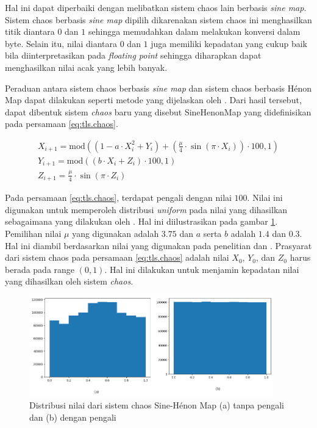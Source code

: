 Hal ini dapat diperbaiki dengan melibatkan sistem chaos lain berbasis \emph{sine map}. Sistem chaos berbasis \emph{sine map} dipilih dikarenakan sistem chaos ini menghasilkan titik diantara $0$ dan $1$ sehingga memudahkan dalam melakukan konversi dalam byte. Selain itu, nilai diantara $0$ dan $1$ juga memiliki kepadatan yang cukup baik bila diinterpretasikan pada \emph{floating point} sehingga diharapkan dapat menghasilkan nilai acak yang lebih banyak.

Peraduan antara sistem chaos berbasis \emph{sine map} dan sistem chaos berbasis Hénon Map dapat dilakukan seperti metode yang dijelaskan oleh \textcite{patel2021}. Dari hasil tersebut, dapat dibentuk sistem \emph{chaos} baru yang disebut SineHenonMap yang didefinisikan pada persamaan \ref{eq:tls.chaos}.

\begin{equation}
  \begin{aligned}
    X_{i+1} = \text{mod}((1 - a \cdot X_i^2 + Y_i) + (\frac{\mu}{4} \cdot \sin{(\pi \cdot X_{i})}) \cdot 100, 1)  \\
    Y_{i+1} = \text{mod}((b \cdot X_i + Z_{i}) \cdot 100, 1) \\
    Z_{i+1} = \frac{\mu}{4} \cdot \sin{(\pi \cdot Z_{i})}
  \end{aligned}
  \label{eq:tls.chaos}
\end{equation}

Pada persamaan \ref{eq:tls.chaos}, terdapat pengali dengan nilai $100$. Nilai ini digunakan untuk memperoleh distribusi \emph{uniform} pada nilai yang dihasilkan sebagaimana yang dilakukan oleh \textcite{nurhaliza2023}. Hal ini diilustrasikan pada gambar \ref{fig:chaos.sinehenonmap.dist}. Pemilihan nilai $\mu$ yang digunakan adalah $3.75$ dan $a$ serta $b$ adalah $1.4$ dan $0.3$. Hal ini diambil berdasarkan nilai yang digunakan pada penelitian \textcite{lin2021} dan \textcite{patel2021}. Prasyarat dari sistem chaos pada persamaan \ref{eq:tls.chaos} adalah nilai $X_0$, $Y_0$, dan $Z_0$ harus berada pada range $(0,1)$. Hal ini dilakukan untuk menjamin kepadatan nilai yang dihasilkan oleh sistem \emph{chaos}.

\begin{figure}[!h]
  \centering
  \includegraphics[width=400px]{chapters/res/chapter-3/img/sinehenon.distribution.png}
  \caption{Distribusi nilai dari sistem chaos Sine-Hénon Map (a) tanpa pengali dan (b) dengan pengali} \label{fig:chaos.sinehenonmap.dist}
\end{figure}

